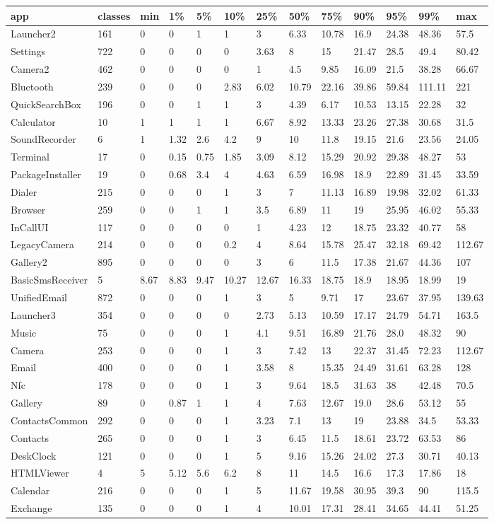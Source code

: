 \begin{tabular}{|l|l|l|l|l|l|l|l|l|l|l|l|l|}
\hline
app&classes&min&1\%&5\%&10\%&25\%&50\%&75\%&90\%&95\%&99\%&max\\
\hline
Launcher2&161&0&0&1&1&3&6.33&10.78&16.9&24.38&48.36&57.5\\
\hline
Settings&722&0&0&0&0&3.63&8&15&21.47&28.5&49.4&80.42\\
\hline
Camera2&462&0&0&0&0&1&4.5&9.85&16.09&21.5&38.28&66.67\\
\hline
Bluetooth&239&0&0&0&2.83&6.02&10.79&22.16&39.86&59.84&111.11&221\\
\hline
QuickSearchBox&196&0&0&1&1&3&4.39&6.17&10.53&13.15&22.28&32\\
\hline
Calculator&10&1&1&1&1&6.67&8.92&13.33&23.26&27.38&30.68&31.5\\
\hline
SoundRecorder&6&1&1.32&2.6&4.2&9&10&11.8&19.15&21.6&23.56&24.05\\
\hline
Terminal&17&0&0.15&0.75&1.85&3.09&8.12&15.29&20.92&29.38&48.27&53\\
\hline
PackageInstaller&19&0&0.68&3.4&4&4.63&6.59&16.98&18.9&22.89&31.45&33.59\\
\hline
Dialer&215&0&0&0&1&3&7&11.13&16.89&19.98&32.02&61.33\\
\hline
Browser&259&0&0&1&1&3.5&6.89&11&19&25.95&46.02&55.33\\
\hline
InCallUI&117&0&0&0&0&1&4.23&12&18.75&23.32&40.77&58\\
\hline
LegacyCamera&214&0&0&0&0.2&4&8.64&15.78&25.47&32.18&69.42&112.67\\
\hline
Gallery2&895&0&0&0&0&3&6&11.5&17.38&21.67&44.36&107\\
\hline
BasicSmsReceiver&5&8.67&8.83&9.47&10.27&12.67&16.33&18.75&18.9&18.95&18.99&19\\
\hline
UnifiedEmail&872&0&0&0&1&3&5&9.71&17&23.67&37.95&139.63\\
\hline
Launcher3&354&0&0&0&0&2.73&5.13&10.59&17.17&24.79&54.71&163.5\\
\hline
Music&75&0&0&0&1&4.1&9.51&16.89&21.76&28.0&48.32&90\\
\hline
Camera&253&0&0&0&1&3&7.42&13&22.37&31.45&72.23&112.67\\
\hline
Email&400&0&0&0&1&3.58&8&15.35&24.49&31.61&63.28&128\\
\hline
Nfc&178&0&0&0&1&3&9.64&18.5&31.63&38&42.48&70.5\\
\hline
Gallery&89&0&0.87&1&1&4&7.63&12.67&19.0&28.6&53.12&55\\
\hline
ContactsCommon&292&0&0&0&1&3.23&7.1&13&19&23.88&34.5&53.33\\
\hline
Contacts&265&0&0&0&1&3&6.45&11.5&18.61&23.72&63.53&86\\
\hline
DeskClock&121&0&0&0&1&5&9.16&15.26&24.02&27.3&30.71&40.13\\
\hline
HTMLViewer&4&5&5.12&5.6&6.2&8&11&14.5&16.6&17.3&17.86&18\\
\hline
Calendar&216&0&0&0&1&5&11.67&19.58&30.95&39.3&90&115.5\\
\hline
Exchange&135&0&0&0&1&4&10.01&17.31&28.41&34.65&44.41&51.25\\
\hline
\end{tabular}
